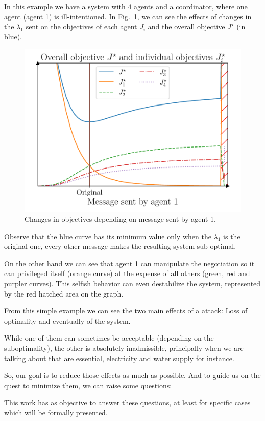 \documentclass[../main.tex]{subfiles}
\begin{document}
\begin{example}
In this example we have a system with $4$ agents and a coordinator, where one agent (agent 1) is ill-intentioned. In Fig.~\ref{fig:change_in_j}, we can see the effects of changes in the $\lambda_{1}$ sent on the objectives of each agent $J_{i}$ and the overall objective $J^{\star}$ (in blue).
  \begin{figure}[H]
    \centering
    \includegraphics[width=.55\textwidth]{../img/qualitative_example.pdf}
    \caption{Changes in objectives depending on message sent by agent 1.}\label{fig:change_in_j}
  \end{figure}
  Observe that the blue curve has its minimum value only when the $\lambda_{1}$ is the original one, every other message makes the resulting system sub-optimal.

  On the other hand we can see that agent 1 can manipulate the negotiation so it can privileged itself (orange curve) at the expense of all others (green, red and purpler curves). This selfish behavior can even destabilize the system, represented by the red hatched area on the graph.
\end{example}

From this simple example we can see the two main effects of a attack: Loss of optimality and eventually  of the system.

While one of them can sometimes be acceptable (depending on the suboptimality), the other is absolutely inadmissible, principally when we are talking about \cps{} that are essential, electricity and water supply for instance.

So, our goal is to reduce those effects as much as possible.
And to guide us on the quest to minimize them, we can raise some questions:

This work has as objective to answer these questions, at least for specific cases which will be formally presented.
\end{document}
